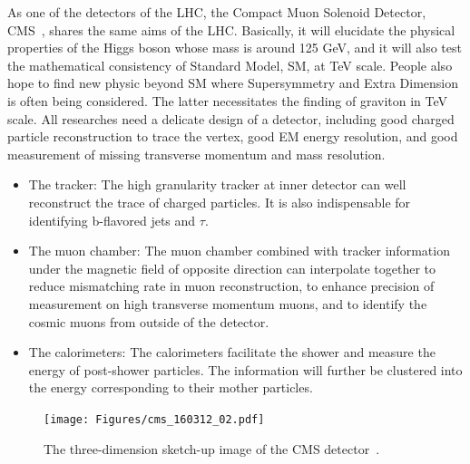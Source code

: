 As one of the detectors of the LHC, the Compact Muon Solenoid Detector, CMS~\citep{CMSDetector}, shares the same aims of the LHC.
Basically, it will elucidate the physical properties of the Higgs boson whose mass is around 125 GeV, and it will also test the mathematical consistency of Standard Model, SM, at TeV scale.
People also hope to find new physic beyond SM where Supersymmetry and Extra Dimension is often being considered. The latter necessitates the finding of graviton in TeV scale.
All researches need a delicate design of a detector, including good charged particle reconstruction to trace the vertex, good EM energy resolution, and good measurement of missing transverse momentum and mass resolution.
\begin{itemize}
\item The tracker: The high granularity tracker at inner detector can well reconstruct the trace of charged particles. It is also indispensable for identifying b-flavored jets and $\tau$.  
\item The muon chamber: The muon chamber combined with tracker information under the magnetic field of opposite direction can  interpolate together to reduce mismatching rate in muon reconstruction, to enhance precision of measurement on high transverse momentum muons, and to identify the cosmic muons from outside of the detector.
\item The calorimeters: The calorimeters facilitate the shower and measure the energy of post-shower particles. The information will further be clustered into the energy corresponding to their mother particles.
\end{itemize}

\begin{figure}[t]
  \begin{center}

    \texttt{[image: Figures/cms\_160312\_02.pdf]} 
    \end{center}
  \caption{The three-dimension sketch-up image of the CMS detector~\citep{CMSImage}.}
\end{figure}

